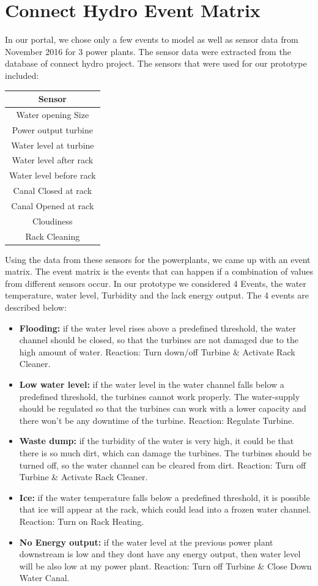 \section{Connect Hydro Event Matrix}
In our portal, we chose only a few events to model as well as sensor data from November 2016 for 3 power plants. The sensor data were extracted from the database of connect hydro project. The sensors that were used for our prototype included:\\
\begin{center}
\begin{tabular}{ |c| } 
 \hline
 Sensor\\ [0.5ex] 
 \hline\hline
Water opening Size\\ 
Power output turbine\\ 
Water level at turbine\\ 
Water level after rack \\ 
Water level before rack\\ 
Canal Closed at rack\\
Canal Opened at rack\\
Cloudiness \\
Rack Cleaning\\
 \hline
\end{tabular}
\end{center}
Using the data from these sensors for the powerplants, we came up with an event matrix. The event matrix is the events that can happen if a combination of values from different sensors occur. In our prototype we considered 4 Events, the water temperature, water level, Turbidity and the lack energy output. The 4 events are described below:\\
\begin{itemize}
	\item \textbf{Flooding:} if the water level rises above a predefined threshold, the water channel should be closed, so that the turbines are not damaged due to the high amount of water. Reaction: Turn down/off Turbine \& Activate Rack Cleaner.
	\item \textbf{Low water level:} if the water level in the water channel falls below a predefined threshold, the turbines cannot work properly. The water-supply should be regulated so that the turbines can work with a lower capacity and there won't be any downtime of the turbine. Reaction: Regulate Turbine.
	\item \textbf{Waste dump:} if the turbidity of the water is very high, it could be that there is so much dirt, which can damage the turbines. The turbines should be turned off, so the water channel can be cleared from dirt. Reaction: Turn off Turbine \& Activate Rack Cleaner.
	\item \textbf{Ice:} if the water temperature falls below a predefined threshold, it is possible that ice will appear at the rack, which could lead into a frozen water channel. Reaction: Turn on Rack Heating.
	\item \textbf{No Energy output:} if the water level at the previous power plant downstream is low and they dont have any energy output, then water level will be also low at my power plant. Reaction: Turn off Turbine \& Close Down Water Canal.
	\end{itemize}
